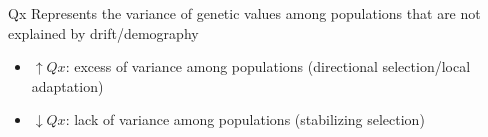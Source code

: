 \begin{frame}
\frametitle{}
\begin{block}{Qx}
Represents the variance of genetic values among populations that are not
explained by drift/demography
\begin{itemize}
\item{$\uparrow Qx$: excess of variance among populations (directional
selection/local adaptation)}
\item{$\downarrow Qx$: lack of variance among populations (stabilizing
selection)}
\end{itemize}

\end{block}
\end{frame}







































